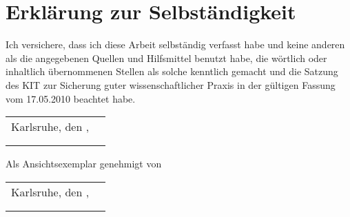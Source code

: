 \chapter*{Erklärung zur Selbständigkeit}
Ich versichere, dass ich diese Arbeit selbständig verfasst habe und keine anderen als die angegebenen Quellen und Hilfsmittel benutzt habe, die wörtlich oder inhaltlich übernommenen Stellen als solche kenntlich gemacht und die Satzung des KIT zur Sicherung guter wissenschaftlicher Praxis in der gültigen Fassung vom 17.05.2010 beachtet habe.\\

\vspace{1cm}

\renewcommand{\arraystretch}{0} %

\begin{flushright}
	\begin{tabular}{rr}
		Karlsruhe, den \thesistimehandin, & \hspace*{5cm}\\[0mm]
		\cline{2-2}\\[2mm] %
		& \thesisauthor
	\end{tabular}
\end{flushright}

\vfill

\begin{flushright}
	Als Ansichtsexemplar genehmigt von\\
	\vspace{1cm}
	\begin{tabular}{rr}
		Karlsruhe, den \thesistimehandin, & \hspace*{5cm}\\[0mm]
		\cline{2-2}\\[2mm] %
		& \thesisreviewerone
	\end{tabular}
\end{flushright}

\renewcommand{\arraystretch}{1}

\cleardoublepage
